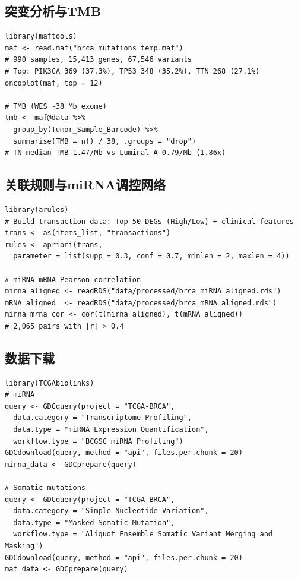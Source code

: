 \documentclass[12pt,a4paper]{ctexart}
\begin{document}
\subsection{突变分析与TMB}
\begin{lstlisting}[caption={12\_advanced\_algorithms.R + 20b\_tmb\_fix.R}, basicstyle=\ttfamily\scriptsize]
library(maftools)
maf <- read.maf("brca_mutations_temp.maf")
# 990 samples, 15,413 genes, 67,546 variants
# Top: PIK3CA 369 (37.3%), TP53 348 (35.2%), TTN 268 (27.1%)
oncoplot(maf, top = 12)

# TMB (WES ~38 Mb exome)
tmb <- maf@data %>%
  group_by(Tumor_Sample_Barcode) %>%
  summarise(TMB = n() / 38, .groups = "drop")
# TN median TMB 1.47/Mb vs Luminal A 0.79/Mb (1.86x)
\end{lstlisting}

\subsection{关联规则与miRNA调控网络}
\begin{lstlisting}[caption={07\_association\_analysis.R + 12\_advanced\_algorithms.R}, basicstyle=\ttfamily\scriptsize]
library(arules)
# Build transaction data: Top 50 DEGs (High/Low) + clinical features
trans <- as(items_list, "transactions")
rules <- apriori(trans,
  parameter = list(supp = 0.3, conf = 0.7, minlen = 2, maxlen = 4))

# miRNA-mRNA Pearson correlation
mirna_aligned <- readRDS("data/processed/brca_miRNA_aligned.rds")
mRNA_aligned  <- readRDS("data/processed/brca_mRNA_aligned.rds")
mirna_mrna_cor <- cor(t(mirna_aligned), t(mRNA_aligned))
# 2,065 pairs with |r| > 0.4
\end{lstlisting}

\subsection{数据下载}
\begin{lstlisting}[caption={02\_download\_mirna.R + 02\_download\_mutations.R}, basicstyle=\ttfamily\scriptsize]
library(TCGAbiolinks)
# miRNA
query <- GDCquery(project = "TCGA-BRCA",
  data.category = "Transcriptome Profiling",
  data.type = "miRNA Expression Quantification",
  workflow.type = "BCGSC miRNA Profiling")
GDCdownload(query, method = "api", files.per.chunk = 20)
mirna_data <- GDCprepare(query)

# Somatic mutations
query <- GDCquery(project = "TCGA-BRCA",
  data.category = "Simple Nucleotide Variation",
  data.type = "Masked Somatic Mutation",
  workflow.type = "Aliquot Ensemble Somatic Variant Merging and Masking")
GDCdownload(query, method = "api", files.per.chunk = 20)
maf_data <- GDCprepare(query)
\end{lstlisting}
\end{document}
